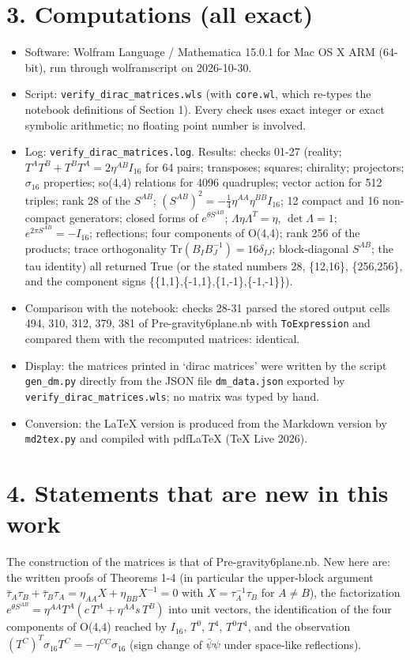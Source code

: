 \documentclass[10pt]{article}
\begin{document}
\section*{3. Computations (all exact)}

\begin{itemize}
\item Software: Wolfram Language / Mathematica 15.0.1 for Mac OS X ARM (64-bit), run through wolframscript on 2026-10-30.
\item Script: \texttt{verify\_dirac\_matrices.wls} (with \texttt{core.wl}, which re-types the notebook definitions of Section 1). Every check uses exact integer or exact symbolic arithmetic; no floating point number is involved.
\item Log: \texttt{verify\_dirac\_matrices.log}. Results: checks 01-27 (reality; $T^AT^B+T^BT^A = 2\eta^{AB}I_{16}$ for 64 pairs; transposes; squares; chirality; projectors; $\sigma_{16}$ properties; so(4,4) relations for 4096 quadruples; vector action for 512 triples; rank 28 of the $S^{AB}$; $(S^{AB})^2 = -\tfrac14\eta^{AA}\eta^{BB}I_{16}$; 12 compact and 16 non-compact generators; closed forms of $e^{\theta S^{AB}}$; $\Lambda\eta\Lambda^T=\eta$, $\det\Lambda = 1$; $e^{2\pi S^{AB}} = -I_{16}$; reflections; four components of O(4,4); rank 256 of the products; trace orthogonality $\mathrm{Tr}(B_IB_J^{-1}) = 16\delta_{IJ}$; block-diagonal $S^{AB}$; the tau identity) all returned True (or the stated numbers 28, \{12,16\}, \{256,256\}, and the component signs \{\{1,1\},\{-1,1\},\{1,-1\},\{-1,-1\}\}).
\item Comparison with the notebook: checks 28-31 parsed the stored output cells 494, 310, 312, 379, 381 of Pre-gravity6plane.nb with \texttt{ToExpression} and compared them with the recomputed matrices: identical.
\item Display: the matrices printed in `dirac matrices' were written by the script \texttt{gen\_dm.py} directly from the JSON file \texttt{dm\_data.json} exported by \texttt{verify\_dirac\_matrices.wls}; no matrix was typed by hand.
\item Conversion: the LaTeX version is produced from the Markdown version by \texttt{md2tex.py} and compiled with pdfLaTeX (TeX Live 2026).
\end{itemize}

\section*{4. Statements that are new in this work}

The construction of the matrices is that of Pre-gravity6plane.nb. New here are: the written proofs of Theorems 1-4 (in particular the upper-block argument $\bar\tau_A\tau_B + \bar\tau_B\tau_A = \eta_{AA}X + \eta_{BB}X^{-1} = 0$ with $X = \tau_A^{-1}\tau_B$ for $A\neq B$), the factorization $e^{\theta S^{AB}} = \eta^{AA}T^A(c\,T^A + \eta^{AA}s\,T^B)$ into unit vectors, the identification of the four components of O(4,4) reached by $I_{16}$, $T^0$, $T^4$, $T^0T^4$, and the observation $(T^C)^T\sigma_{16}T^C = -\eta^{CC}\sigma_{16}$ (sign change of $\bar\psi\psi$ under space-like reflections).
\end{document}
